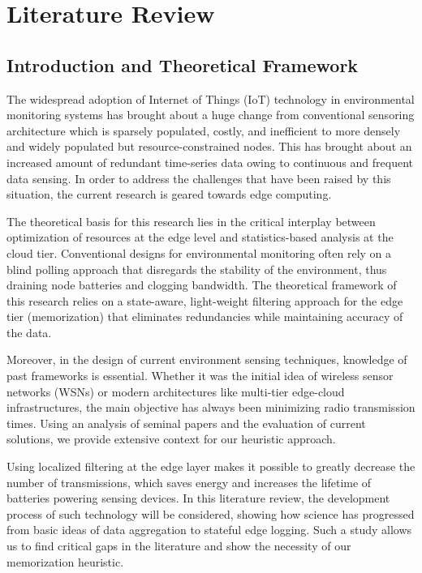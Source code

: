 \chapter{Literature Review}
\label{ch:literature}

\section{Introduction and Theoretical Framework}
The widespread adoption of Internet of Things (IoT) technology in environmental monitoring systems has brought about a huge change from conventional sensoring architecture which is sparsely populated, costly, and inefficient to more densely and widely populated but resource-constrained nodes. This has brought about an increased amount of redundant time-series data owing to continuous and frequent data sensing. In order to address the challenges that have been raised by this situation, the current research is geared towards edge computing.

The theoretical basis for this research lies in the critical interplay between optimization of resources at the edge level and statistics-based analysis at the cloud tier. Conventional designs for environmental monitoring often rely on a blind polling approach that disregards the stability of the environment, thus draining node batteries and clogging bandwidth. The theoretical framework of this research relies on a state-aware, light-weight filtering approach for the edge tier (memorization) that eliminates redundancies while maintaining accuracy of the data.

Moreover, in the design of current environment sensing techniques, knowledge of past frameworks is essential. Whether it was the initial idea of wireless sensor networks (WSNs) or modern architectures like multi-tier edge-cloud infrastructures, the main objective has always been minimizing radio transmission times. Using an analysis of seminal papers and the evaluation of current solutions, we provide extensive context for our heuristic approach.

Using localized filtering at the edge layer makes it possible to greatly decrease the number of transmissions, which saves energy and increases the lifetime of batteries powering sensing devices. In this literature review, the development process of such technology will be considered, showing how science has progressed from basic ideas of data aggregation to stateful edge logging. Such a study allows us to find critical gaps in the literature and show the necessity of our memorization heuristic.


